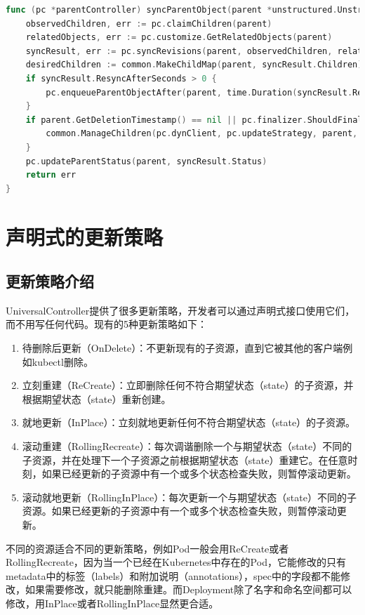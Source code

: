 \documentclass[macfonts,master]{njuthesis}
\begin{document}
\begin{lstlisting}[language=Go,caption=同步父资源,label=listing:syncparent]
func (pc *parentController) syncParentObject(parent *unstructured.Unstructured) error {
	observedChildren, err := pc.claimChildren(parent)
	relatedObjects, err := pc.customize.GetRelatedObjects(parent)
	syncResult, err := pc.syncRevisions(parent, observedChildren, relatedObjects)
	desiredChildren := common.MakeChildMap(parent, syncResult.Children)
	if syncResult.ResyncAfterSeconds > 0 {
		pc.enqueueParentObjectAfter(parent, time.Duration(syncResult.ResyncAfterSeconds*float64(time.Second)))
	}
	if parent.GetDeletionTimestamp() == nil || pc.finalizer.ShouldFinalize(parent) {
		common.ManageChildren(pc.dynClient, pc.updateStrategy, parent, observedChildren, desiredChildren)
	}
	pc.updateParentStatus(parent, syncResult.Status)
	return err
}
\end{lstlisting}

\section{声明式的更新策略}
\subsection{更新策略介绍}
UniversalController提供了很多更新策略，开发者可以通过声明式接口使用它们，而不用写任何代码。现有的5种更新策略如下：
\begin{enumerate}
	\item 待删除后更新（OnDelete）：不更新现有的子资源，直到它被其他的客户端例如kubectl删除。
	\item 立刻重建（ReCreate）：立即删除任何不符合期望状态（state）的子资源，并根据期望状态（state）重新创建。
	\item 就地更新（InPlace）：立刻就地更新任何不符合期望状态（state）的子资源。
	\item 滚动重建（RollingRecreate）：每次调谐删除一个与期望状态（state）不同的子资源，并在处理下一个子资源之前根据期望状态（state）重建它。在任意时刻，如果已经更新的子资源中有一个或多个状态检查失败，则暂停滚动更新。
	\item 滚动就地更新（RollingInPlace）：每次更新一个与期望状态（state）不同的子资源。如果已经更新的子资源中有一个或多个状态检查失败，则暂停滚动更新。
\end{enumerate}

不同的资源适合不同的更新策略，例如Pod一般会用ReCreate或者RollingRecreate，因为当一个已经在Kubernetes中存在的Pod，它能修改的只有metadata中的标签（labels）和附加说明（annotations），spec中的字段都不能修改，如果需要修改，就只能删除重建。而Deployment除了名字和命名空间都可以修改，用InPlace或者RollingInPlace显然更合适。
\end{document}
